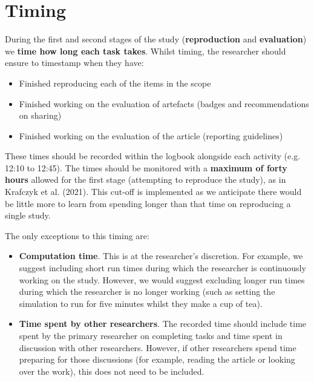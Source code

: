 \vspace{1cm}
\section{Timing} \label{sec:timing}

During the first and second stages of the study (\textbf{reproduction} and \textbf{evaluation}) we \textbf{time how long each task takes}. Whilst timing, the researcher should ensure to timestamp when they have:
\begin{itemize}
    \item Finished reproducing each of the items in the scope
    \item Finished working on the evaluation of artefacts (badges and recommendations on sharing)
    \item Finished working on the evaluation of the article (reporting guidelines)
\end{itemize}

These times should be recorded within the logbook alongside each activity (e.g. 12:10 to 12:45). The times should be monitored with a \textbf{maximum of forty hours} allowed for the first stage (attempting to reproduce the study), as in Krafczyk et al. (2021).\autocite{krafczyk_learning_2021} This cut-off is implemented as we anticipate there would be little more to learn from spending longer than that time on reproducing a single study.

The only exceptions to this timing are:
\begin{itemize}
    \item \textbf{Computation time}. This is at the researcher's discretion. For example, we suggest including short run times during which the researcher is continuously working on the study. However, we would suggest excluding longer run times during which the researcher is no longer working (such as setting the simulation to run for five minutes whilst they make a cup of tea).
    \item \textbf{Time spent by other researchers}. The recorded time should include time spent by the primary researcher on completing tasks and time spent in discussion with other researchers. However, if other researchers spend time preparing for those discussions (for example, reading the article or looking over the work), this does not need to be included.
\end{itemize}